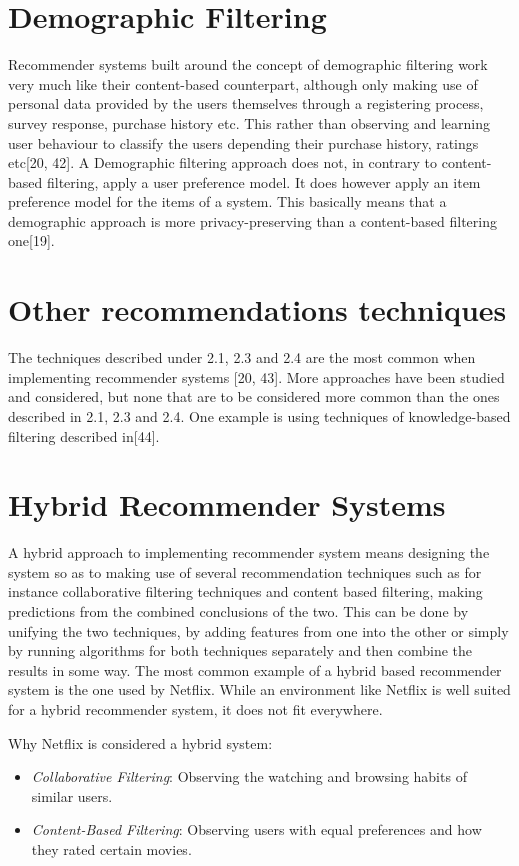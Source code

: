 \section{Demographic Filtering}
Recommender systems built around the concept of demographic filtering work very much like their content-based counterpart, although only making use of personal data provided by the users themselves through a registering process, survey response, purchase history etc. This rather than observing and learning user behaviour to classify the users depending their purchase history, ratings etc[20, 42]. A Demographic filtering approach does not, in contrary to content-based filtering, apply a user preference model. It does however apply an item preference model for the items of a system. This basically means that a demographic approach is more privacy-preserving than a content-based filtering one[19].

\section{Other recommendations techniques}
The techniques described under 2.1, 2.3 and 2.4 are the most common when implementing recommender systems [20, 43]. More approaches have been studied and considered, but none that are to be considered more common than the ones described in 2.1, 2.3 and 2.4. One example is using techniques of knowledge-based filtering described in[44].

\section{Hybrid Recommender Systems}
A hybrid approach to implementing recommender system means designing the system so as to making use of several recommendation techniques such as for instance collaborative filtering techniques and content based filtering, making predictions from the combined conclusions of the two. This can be done by unifying the two techniques, by adding features from one into the other or simply by running algorithms for both techniques separately and then combine the results in some way. The most common example of a hybrid based recommender system is the one used by Netflix. While an environment like Netflix is well suited for a hybrid recommender system, it does not fit everywhere.

Why Netflix is considered a hybrid system:

\begin{itemize}
	\item {\textit{Collaborative Filtering}: Observing the watching and browsing habits of similar users.}
	\item {\textit{Content-Based Filtering}: Observing users with equal preferences and how they rated certain movies.}

\end{itemize}

